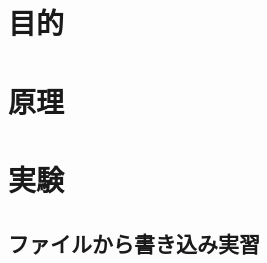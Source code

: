 \documentclass{jsarticle}
\begin{document}
\section{目的}

\section{原理}

\section{実験}
\subsection{ファイルから書き込み実習}

    \begin{lstlisting}[caption=ファイルから書き込み実習\label{c1}]

    \end{lstlisting}
\end{document}
